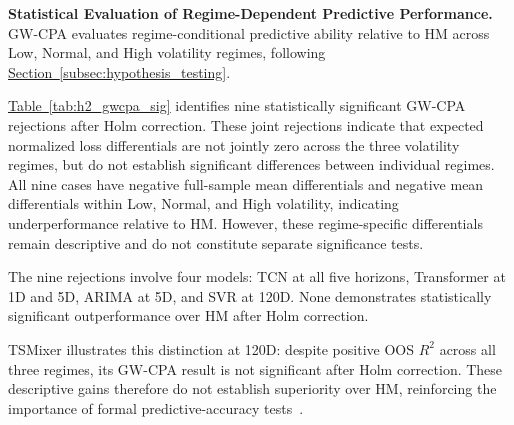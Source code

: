 \documentclass[runningheads,orivec]{llncs}
\begin{document}
\noindent\textbf{Statistical Evaluation of Regime-Dependent Predictive Performance.}
GW-CPA evaluates regime-conditional predictive ability relative to HM across Low, Normal, and High volatility regimes, following \hyperref[subsec:hypothesis_testing]{Section~\ref*{subsec:hypothesis_testing}}.

\hyperref[tab:h2_gwcpa_sig]{Table~\ref*{tab:h2_gwcpa_sig}} identifies nine statistically significant GW-CPA rejections after Holm correction. These joint rejections indicate that expected normalized loss differentials are not jointly zero across the three volatility regimes, but do not establish significant differences between individual regimes. All nine cases have negative full-sample mean differentials and negative mean differentials within Low, Normal, and High volatility, indicating underperformance relative to HM. However, these regime-specific differentials remain descriptive and do not constitute separate significance tests.

The nine rejections involve four models: TCN at all five horizons, Transformer at 1D and 5D, ARIMA at 5D, and SVR at 120D. None demonstrates statistically significant outperformance over HM after Holm correction.

TSMixer illustrates this distinction at 120D: despite positive OOS $R^2$ across all three regimes, its GW-CPA result is not significant after Holm correction. These descriptive gains therefore do not establish superiority over HM, reinforcing the importance of formal predictive-accuracy tests~\cite{diebold1995,giacomini2006,giacomini2010}.
\end{document}

